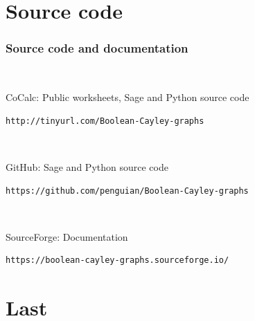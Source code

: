 \documentclass[pdf,sprung,slideColor,nocolorBG]{beamer}
\newenvironment{colortheme}[1]{
\def\ProvidesPackageRCS $##1${\relax}
\renewcommand{\ProcessOptions}{\relax}
\makeatletter

\makeatother
}{}
\begin{document}
\section{Source code}

\begin{colortheme}{jubata}

\begin{frame}[fragile]
\frametitle{Source code and documentation}
~

CoCalc: Public worksheets, Sage and Python source code

\begin{verbatim}
http://tinyurl.com/Boolean-Cayley-graphs
\end{verbatim}

~

GitHub: Sage and Python source code

\begin{verbatim}
https://github.com/penguian/Boolean-Cayley-graphs
\end{verbatim}

~

SourceForge: Documentation

\begin{verbatim}
https://boolean-cayley-graphs.sourceforge.io/
\end{verbatim}
\end{frame}

\end{colortheme}

\section{Last}
\end{document}
